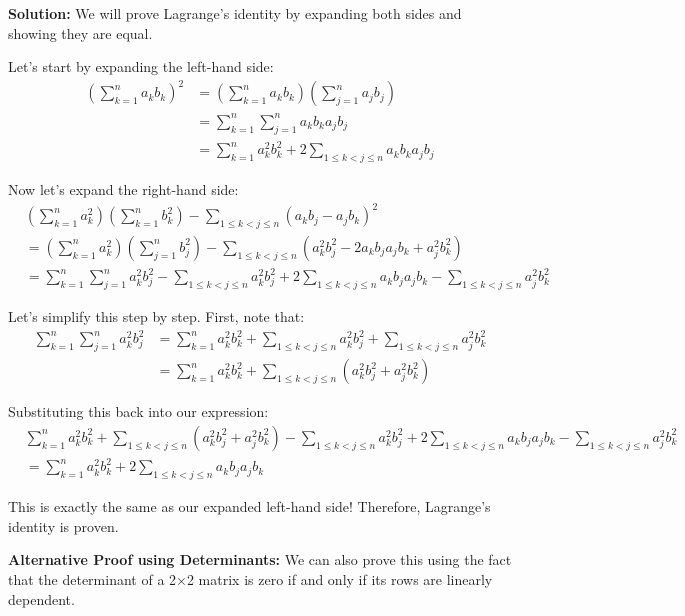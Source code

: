 \textbf{Solution:}
We will prove Lagrange's identity by expanding both sides and showing they are equal.

Let's start by expanding the left-hand side:
\begin{align*}
\left( \sum_{k=1}^n a_k b_k \right)^2 &= \left( \sum_{k=1}^n a_k b_k \right) \left( \sum_{j=1}^n a_j b_j \right) \\
&= \sum_{k=1}^n \sum_{j=1}^n a_k b_k a_j b_j \\
&= \sum_{k=1}^n a_k^2 b_k^2 + 2 \sum_{1 \leq k < j \leq n} a_k b_k a_j b_j
\end{align*}

Now let's expand the right-hand side:
\begin{align*}
&\left( \sum_{k=1}^n a_k^2 \right)\left( \sum_{k=1}^n b_k^2 \right) - \sum_{1 \leq k < j \leq n} (a_k b_j - a_j b_k)^2 \\
&= \left( \sum_{k=1}^n a_k^2 \right)\left( \sum_{j=1}^n b_j^2 \right) - \sum_{1 \leq k < j \leq n} (a_k^2 b_j^2 - 2a_k b_j a_j b_k + a_j^2 b_k^2) \\
&= \sum_{k=1}^n \sum_{j=1}^n a_k^2 b_j^2 - \sum_{1 \leq k < j \leq n} a_k^2 b_j^2 + 2 \sum_{1 \leq k < j \leq n} a_k b_j a_j b_k - \sum_{1 \leq k < j \leq n} a_j^2 b_k^2
\end{align*}

Let's simplify this step by step. First, note that:
\begin{align*}
\sum_{k=1}^n \sum_{j=1}^n a_k^2 b_j^2 &= \sum_{k=1}^n a_k^2 b_k^2 + \sum_{1 \leq k < j \leq n} a_k^2 b_j^2 + \sum_{1 \leq k < j \leq n} a_j^2 b_k^2 \\
&= \sum_{k=1}^n a_k^2 b_k^2 + \sum_{1 \leq k < j \leq n} (a_k^2 b_j^2 + a_j^2 b_k^2)
\end{align*}

Substituting this back into our expression:
\begin{align*}
&\sum_{k=1}^n a_k^2 b_k^2 + \sum_{1 \leq k < j \leq n} (a_k^2 b_j^2 + a_j^2 b_k^2) - \sum_{1 \leq k < j \leq n} a_k^2 b_j^2 + 2 \sum_{1 \leq k < j \leq n} a_k b_j a_j b_k - \sum_{1 \leq k < j \leq n} a_j^2 b_k^2 \\
&= \sum_{k=1}^n a_k^2 b_k^2 + 2 \sum_{1 \leq k < j \leq n} a_k b_j a_j b_k
\end{align*}

This is exactly the same as our expanded left-hand side! Therefore, Lagrange's identity is proven.

\textbf{Alternative Proof using Determinants:}
We can also prove this using the fact that the determinant of a 2×2 matrix is zero if and only if its rows are linearly dependent.

